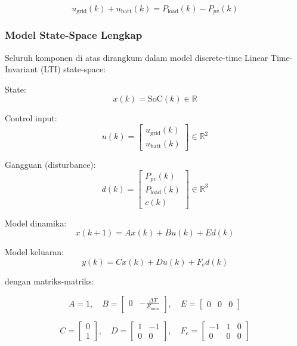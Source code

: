 \documentclass{article}
\begin{document}
\begin{equation}
u_{\text{grid}}(k) + u_{\text{batt}}(k) = P_{\text{load}}(k) - P_{pv}(k)
\end{equation}

\subsubsection{Model State-Space Lengkap}

Seluruh komponen di atas dirangkum dalam model discrete-time Linear Time-Invariant (LTI) state-space:

State:
$$x(k) = \text{SoC}(k) \in \mathbb{R}$$

Control input:
$$u(k) = \begin{bmatrix} u_{\text{grid}}(k) \\ u_{\text{batt}}(k) \end{bmatrix} \in \mathbb{R}^2$$

Gangguan (disturbance):
$$d(k) = \begin{bmatrix} P_{pv}(k) \\ P_{\text{load}}(k) \\ c(k) \end{bmatrix} \in \mathbb{R}^3$$

Model dinamika:
\begin{equation}
x(k+1) = A x(k) + B u(k) + E d(k)
\end{equation}

Model keluaran:
\begin{equation}
y(k) = C x(k) + D u(k) + F_e d(k)
\end{equation}

dengan matriks-matriks:

$$A = 1, \quad B = \begin{bmatrix} 0 & -\frac{\Delta T}{E_{\text{nom}}} \end{bmatrix}, \quad E = \begin{bmatrix} 0 & 0 & 0 \end{bmatrix}$$

$$C = \begin{bmatrix} 0 \\ 1 \end{bmatrix}, \quad D = \begin{bmatrix} 1 & -1 \\ 0 & 0 \end{bmatrix}, \quad F_e = \begin{bmatrix} -1 & 1 & 0 \\ 0 & 0 & 0 \end{bmatrix}$$
\end{document}
